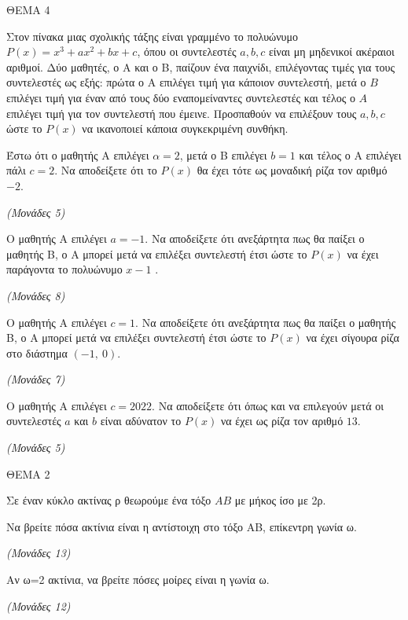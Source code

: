 \documentclass[11pt,a4paper,twoside]{book}
\newcommand{\monades}[1]{\hfill \textit{(Μονάδες #1)}}
\begin{document}
ΘΕΜΑ 4

Στον πίνακα μιας σχολικής τάξης είναι γραμμένο το πολυώνυμο $P(x) = x^{3} + ax^{2} + bx + c$, όπου οι συντελεστές $a,b,c$ είναι μη μηδενικοί ακέραιοι αριθμοί. Δύο μαθητές, ο Α και ο Β, παίζουν ένα παιχνίδι, επιλέγοντας τιμές για τους συντελεστές ως εξής: πρώτα ο Α επιλέγει τιμή για κάποιον συντελεστή, μετά ο $Β$ επιλέγει τιμή για έναν από τους δύο εναπομείναντες συντελεστές και τέλος ο $Α$ επιλέγει τιμή για τον συντελεστή που έμεινε. Προσπαθούν να επιλέξουν τους $a,b,c$ ώστε το $P(x)$ να ικανοποιεί κάποια συγκεκριμένη συνθήκη.

\begin{alist}
\item Έστω ότι ο μαθητής Α επιλέγει $\alpha = 2$, μετά ο Β επιλέγει $b = 1$ και τέλος ο Α επιλέγει πάλι $c = 2$. Να αποδείξετε ότι το $P(x)$ θα έχει τότε ως μοναδική ρίζα τον αριθμό $- 2$.

\monades{5}

\item Ο μαθητής Α επιλέγει $a = - 1$. Να αποδείξετε ότι ανεξάρτητα πως θα παίξει ο μαθητής Β, ο Α μπορεί μετά να επιλέξει συντελεστή έτσι ώστε το $P(x)$ να έχει παράγοντα το πολυώνυμο $x - 1$ .

\monades{8}

\item Ο μαθητής Α επιλέγει $c = 1$. Να αποδείξετε ότι ανεξάρτητα πως θα παίξει ο μαθητής Β, ο Α μπορεί μετά να επιλέξει συντελεστή έτσι ώστε το $P(x)$ να έχει σίγουρα ρίζα στο διάστημα $( - 1,\ 0)$.

\monades{7}

\item Ο μαθητής Α επιλέγει $c = 2022$. Να αποδείξετε ότι όπως και να επιλεγούν μετά οι συντελεστές $a$ και $b$ είναι αδύνατον το $P(x)$ να έχει ως ρίζα τον αριθμό $13$.

\monades{5}
\end{alist}

\vspace{4mm}

ΘΕΜΑ 2

Σε έναν κύκλο ακτίνας ρ θεωρούμε ένα τόξο $AB$ με μήκος ίσο με 2ρ.

\begin{alist}
\item Να βρείτε πόσα ακτίνια είναι η αντίστοιχη στο τόξο ΑΒ, επίκεντρη γωνία ω.

\monades{13}

\item Αν ω=2 ακτίνια, να βρείτε πόσες μοίρες είναι η γωνία ω.

\monades{12}
\end{alist}
\end{document}

